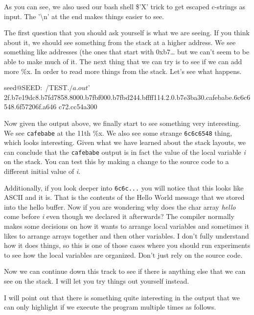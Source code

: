 As you can see, we also used our bash shell \$'X' trick to get escaped c-strings as input. The '\textbackslash n' at the end makes things easier to see. 
 
The first question that you should ask yourself is what we are seeing. If you think about it, we should see something from the stack at a higher address. We see something like addresses (the ones that start with 0xb7… but we can’t seem to be able to make much of it. The next thing that we can try is to see if we can add more \%x. In order to read more things from the stack. Let’s see what happens. 

\begin{code} 
seed@SEED:~/TEST$ ./a.out $'%
2f.b7e19dc8.b7fd7858.8000.b7fbf000.b7fbd244.bffff114.2.0.b7e3ba30.cafebabe.6c6c6548.6f57206f.a646 c72.cc54a300 
\end{code} 

Now given the output above, we finally start to see something very interesting. We see {\tt cafebabe} at the 11th \%x. We also see some strange {\tt 6c6c6548} thing, which looks interesting. Given what we have learned about the stack layouts, we can conclude that the {\tt cafebabe} output is in fact the value of the local variable {\em i} on the stack. You can test this by making a change to the source code to a different initial value of {\em i}.  
 
Additionally, if you look deeper into {\tt 6c6c...} you will notice that this looks like ASCII and it is. That is the contents of the Hello World message that we stored into the hello buffer. Now if you are wondering why does the char array {\em hello} come before {\em i} even though we declared it afterwards? The compiler normally makes some decisions on how it wants to arrange local variables and sometimes it likes to arrange arrays together and then other variables. I don’t fully understand how it does things, so this is one of those cases where you should run experiments to see how the local variables are organized. Don’t just rely on the source code. 
 
Now we can continue down this track to see if there is anything else that we can see on the stack. I will let you try things out yourself instead. 
 
I will point out that there is something quite interesting in the output that we can only highlight if we execute the program multiple times as follows. 


